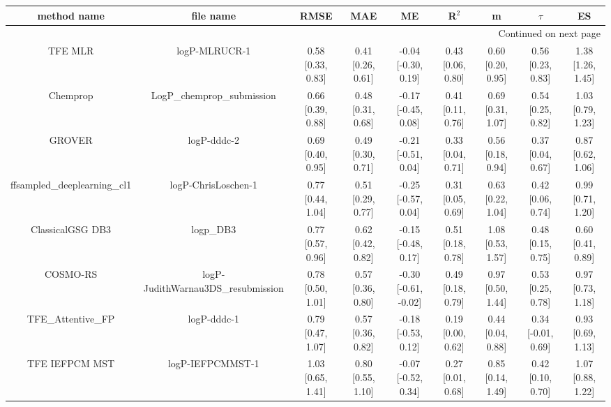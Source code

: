 \documentclass{article}
\begin{document}
\begin{center}
\scriptsize
\begin{longtable}{|ccccccccc|}
\toprule
                method name &                                   file name &               RMSE &                MAE &                    ME &              R$^2$ &                     m &                $\tau$ &                    ES \\
\midrule
\endhead
\midrule
\multicolumn{9}{r}{{Continued on next page}} \\
\midrule
\endfoot

\bottomrule
\endlastfoot
                    TFE MLR &                               logP-MLRUCR-1 &  0.58 [0.33, 0.83] &  0.41 [0.26, 0.61] &   -0.04 [-0.30, 0.19] &  0.43 [0.06, 0.80] &     0.60 [0.20, 0.95] &     0.56 [0.23, 0.83] &     1.38 [1.26, 1.45] \\
                   Chemprop &                  LogP\_chemprop\_submission &  0.66 [0.39, 0.88] &  0.48 [0.31, 0.68] &   -0.17 [-0.45, 0.08] &  0.41 [0.11, 0.76] &     0.69 [0.31, 1.07] &     0.54 [0.25, 0.82] &     1.03 [0.79, 1.23] \\
                     GROVER &                                 logP-dddc-2 &  0.69 [0.40, 0.95] &  0.49 [0.30, 0.71] &   -0.21 [-0.51, 0.04] &  0.33 [0.04, 0.71] &     0.56 [0.18, 0.94] &     0.37 [0.04, 0.67] &     0.87 [0.62, 1.06] \\
 ffsampled_deeplearning_cl1 &                         logP-ChrisLoschen-1 &  0.77 [0.44, 1.04] &  0.51 [0.29, 0.77] &   -0.25 [-0.57, 0.04] &  0.31 [0.05, 0.69] &     0.63 [0.22, 1.04] &     0.42 [0.06, 0.74] &     0.99 [0.71, 1.20] \\
           ClassicalGSG DB3 &                                   logp\_DB3 &  0.77 [0.57, 0.96] &  0.62 [0.42, 0.82] &   -0.15 [-0.48, 0.17] &  0.51 [0.18, 0.78] &     1.08 [0.53, 1.57] &     0.48 [0.15, 0.75] &     0.60 [0.41, 0.89] \\
                   COSMO-RS &          logP-JudithWarnau3DS\_resubmission &  0.78 [0.50, 1.01] &  0.57 [0.36, 0.80] &  -0.30 [-0.61, -0.02] &  0.49 [0.18, 0.79] &     0.97 [0.50, 1.44] &     0.53 [0.25, 0.78] &     0.97 [0.73, 1.18] \\
           TFE_Attentive_FP &                                 logP-dddc-1 &  0.79 [0.47, 1.07] &  0.57 [0.36, 0.82] &   -0.18 [-0.53, 0.12] &  0.19 [0.00, 0.62] &     0.44 [0.04, 0.88] &    0.34 [-0.01, 0.69] &     0.93 [0.69, 1.13] \\
             TFE IEFPCM MST &                            logP-IEFPCMMST-1 &  1.03 [0.65, 1.41] &  0.80 [0.55, 1.10] &   -0.07 [-0.52, 0.34] &  0.27 [0.01, 0.68] &     0.85 [0.14, 1.49] &     0.42 [0.10, 0.70] &     1.07 [0.88, 1.22] \\

\end{longtable}
\end{center}
\end{document}
